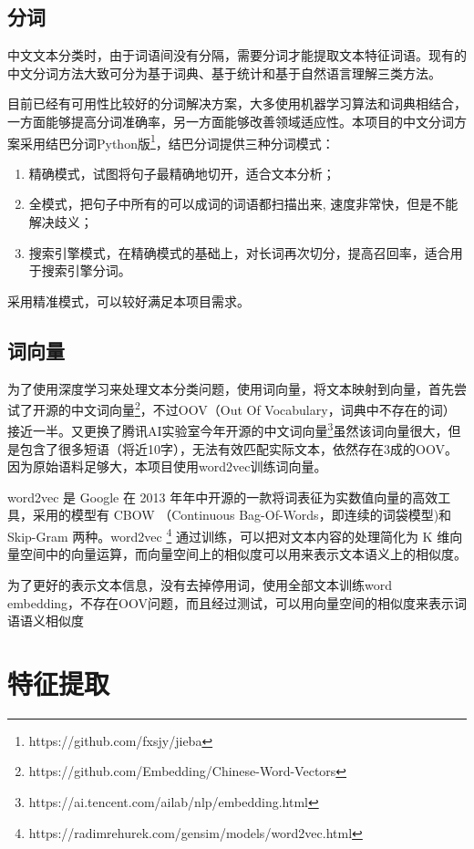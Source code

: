 \documentclass[a4paper]{article}
\begin{document}
\subsection{分词}
中文文本分类时，由于词语间没有分隔，需要分词才能提取文本特征词语。现有的中文分词方法大致可分为基于词典、基于统计和基于自然语言理解三类方法。

目前已经有可用性比较好的分词解决方案，大多使用机器学习算法和词典相结合，一方面能够提高分词准确率，另一方面能够改善领域适应性。本项目的中文分词方案采用结巴分词Python版\footnote{https://github.com/fxsjy/jieba}，结巴分词提供三种分词模式：
\begin{enumerate}
	\item 精确模式，试图将句子最精确地切开，适合文本分析；
	\item 全模式，把句子中所有的可以成词的词语都扫描出来, 速度非常快，但是不能解决歧义；
	\item 搜索引擎模式，在精确模式的基础上，对长词再次切分，提高召回率，适合用于搜索引擎分词。
\end{enumerate}
采用精准模式，可以较好满足本项目需求。

\subsection{词向量}
为了使用深度学习来处理文本分类问题，使用词向量，将文本映射到向量，首先尝试了开源的中文词向量\footnote{https://github.com/Embedding/Chinese-Word-Vectors}，不过OOV（Out Of Vocabulary，词典中不存在的词）接近一半。又更换了腾讯AI实验室今年开源的中文词向量\footnote{https://ai.tencent.com/ailab/nlp/embedding.html}虽然该词向量很大，但是包含了很多短语（将近10字），无法有效匹配实际文本，依然存在3成的OOV。因为原始语料足够大，本项目使用word2vec训练词向量。

word2vec\cite{goldberg2014word2vec} 是 Google 在 2013 年年中开源的一款将词表征为实数值向量的高效工具，采用的模型有 CBOW （Continuous Bag-Of-Words，即连续的词袋模型)和 Skip-Gram 两种。word2vec \footnote{https://radimrehurek.com/gensim/models/word2vec.html} 通过训练，可以把对文本内容的处理简化为 K 维向量空间中的向量运算，而向量空间上的相似度可以用来表示文本语义上的相似度。

为了更好的表示文本信息，没有去掉停用词，使用全部文本训练word embedding，不存在OOV问题，而且经过测试，可以用向量空间的相似度来表示词语语义相似度


\section{特征提取}
\end{document}
